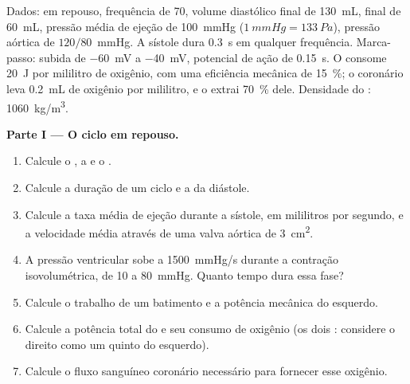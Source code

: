\begin{problem}
\label{pb:b2:heart:1}
Dados: em repouso, frequência de 70, volume diastólico final de
\qty{130}{mL},  final de \qty{60}{mL}, pressão média de
ejeção de \qty{100}{mmHg} ($\qty{1}{mmHg} = \qty{133}{Pa}$), pressão
aórtica de $120/80$~mmHg. A sístole dura \qty{0.3}{s} em qualquer
frequência. Marca-passo: subida de \qty{-60}{mV} a \qty{-40}{mV},
potencial de ação de \qty{0.15}{s}. O  consome \qty{20}{J} por
mililitro de oxigênio, com uma eficiência mecânica de \qty{15}{\%}; o
 coronário leva \qty{0.2}{mL} de oxigênio por mililitro, e o
 extrai \qty{70}{\%} dele. Densidade do :
\qty{1060}{kg/m^3}.

\medskip
\noindent\textbf{Parte I --- O ciclo em repouso.}
\begin{enumerate}
  \item Calcule o , a  e o .
  \item Calcule a duração de um ciclo e a da diástole.
  \item Calcule a taxa média de ejeção durante a sístole, em mililitros
        por segundo, e a velocidade média através de uma valva aórtica de
        \qty{3}{cm^2}.
  \item A pressão ventricular sobe a \qty{1500}{mmHg/s} durante a
        contração isovolumétrica, de 10 a \qty{80}{mmHg}. Quanto tempo
        dura essa fase?
  \item Calcule o trabalho de um batimento e a potência mecânica do
         esquerdo.
  \item Calcule a potência total do  e seu consumo de oxigênio
        (os dois : considere o direito como um quinto do
        esquerdo).
  \item Calcule o fluxo sanguíneo coronário necessário para fornecer
        esse oxigênio.
\end{enumerate}


\end{problem}
